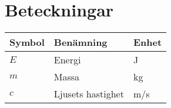 \section*{Beteckningar}
\vspace{-5mm}
\begin{table}[H]
\begin{tabular}{ l l l }
\toprule
\textbf{Symbol} & \textbf{Benämning} & \textbf{Enhet} \\
\midrule
    $E$ & Energi & \si{J} \\
    $m$ & Massa & \si{kg} \\
    $c$ & Ljusets hastighet & \si{m/s} \\
\bottomrule
\end{tabular}
\end{table}